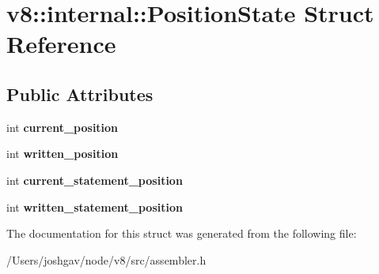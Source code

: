 \hypertarget{structv8_1_1internal_1_1_position_state}{}\section{v8\+:\+:internal\+:\+:Position\+State Struct Reference}
\label{structv8_1_1internal_1_1_position_state}
\subsection*{Public Attributes}
\begin{DoxyCompactItemize}
\item 
int {\bfseries current\+\_\+position}\hypertarget{structv8_1_1internal_1_1_position_state_ac73d503b2191a64c1d296b14663b4fcf}{}\label{structv8_1_1internal_1_1_position_state_ac73d503b2191a64c1d296b14663b4fcf}

\item 
int {\bfseries written\+\_\+position}\hypertarget{structv8_1_1internal_1_1_position_state_a657fdf78593d1217fd15eeec9e0edaab}{}\label{structv8_1_1internal_1_1_position_state_a657fdf78593d1217fd15eeec9e0edaab}

\item 
int {\bfseries current\+\_\+statement\+\_\+position}\hypertarget{structv8_1_1internal_1_1_position_state_ac6a6cca50de725a2dabb85ebffee1cf9}{}\label{structv8_1_1internal_1_1_position_state_ac6a6cca50de725a2dabb85ebffee1cf9}

\item 
int {\bfseries written\+\_\+statement\+\_\+position}\hypertarget{structv8_1_1internal_1_1_position_state_afd9d6fd2849f85c04db5deebbf97039a}{}\label{structv8_1_1internal_1_1_position_state_afd9d6fd2849f85c04db5deebbf97039a}

\end{DoxyCompactItemize}


The documentation for this struct was generated from the following file\+:\begin{DoxyCompactItemize}
\item 
/\+Users/joshgav/node/v8/src/assembler.\+h\end{DoxyCompactItemize}
